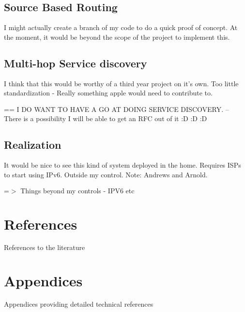 \documentclass[12pt]{report}
\begin{document}
\section{Source Based Routing}
I might actually create a branch of my code to do a quick proof of concept. At the moment, 
it would be beyond the scope of the project to implement this. 

\section{Multi-hop Service discovery}
I think that this would be worthy of a third year project on it's own. 
Too little standardization - Really something apple would need to contribute to. 

== I DO WANT TO HAVE A GO AT DOING SERVICE DISCOVERY.
-- There is a possibility I will be able to get an RFC out of it :D :D :D

\section{Realization}
It would be nice to see this kind of system deployed in the home. 
Requires ISPs to start using IPv6.
Outside my control. 
Note: Andrews and Arnold.

=$>$ Things beyond my controls - IPV6 etc

\chapter{References}
References to the literature

\chapter{Appendices}
Appendices providing detailed technical references
\end{document}
